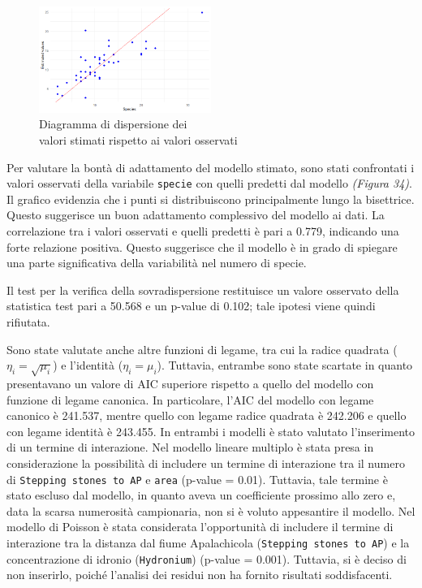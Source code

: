 \documentclass{article} %
\begin{document}
\begin{figure}[H]
    \centering
    \includegraphics[width=0.5\textwidth]{immagini/res_val_oss_glm.png}
    \captionsetup{justification=centering}
    \caption{Diagramma di dispersione dei \\valori stimati rispetto ai valori osservati}
\end{figure}

Per valutare la bontà di adattamento del modello stimato, sono stati confrontati i valori osservati della variabile \texttt{specie} con quelli predetti dal modello \textit{(Figura 34)}. Il grafico evidenzia che i punti si distribuiscono principalmente lungo la bisettrice. Questo suggerisce un buon adattamento complessivo del modello ai dati. La correlazione tra i valori osservati e quelli predetti è pari a 0.779, indicando una forte relazione positiva. Questo suggerisce che il modello è in grado di spiegare una parte significativa della variabilità nel numero di specie.

Il test per la verifica della sovradispersione restituisce un valore osservato della statistica test pari a 50.568 e un p-value di 0.102; tale ipotesi viene quindi rifiutata.  

Sono state valutate anche altre funzioni di legame, tra cui la radice quadrata ($\eta_i=\sqrt{\mu_i}$) e l'identità ($\eta_i=\mu_i$). Tuttavia, entrambe sono state scartate in quanto presentavano un valore di AIC superiore rispetto a quello del modello con funzione di legame canonica. In particolare, l'AIC del modello con legame canonico è 241.537, mentre quello con legame radice quadrata è 242.206 e quello con legame identità è 243.455.
In entrambi i modelli è stato valutato l'inserimento di un termine di interazione.
Nel modello lineare multiplo è stata presa in considerazione la possibilità di includere un termine di interazione tra il numero di \texttt{Stepping stones to AP} e \texttt{area} (p-value = 0.01). Tuttavia, tale termine è stato escluso dal modello, in quanto aveva un coefficiente prossimo allo zero e, data la scarsa numerosità campionaria, non si è voluto appesantire il modello.
Nel modello di Poisson è stata considerata l'opportunità di includere il termine di interazione tra la distanza dal fiume Apalachicola (\texttt{Stepping stones to AP}) e la concentrazione di idronio (\texttt{Hydronium}) (p-value = 0.001). Tuttavia, si è deciso di non inserirlo, poiché l'analisi dei residui non ha fornito risultati soddisfacenti.
\end{document}
